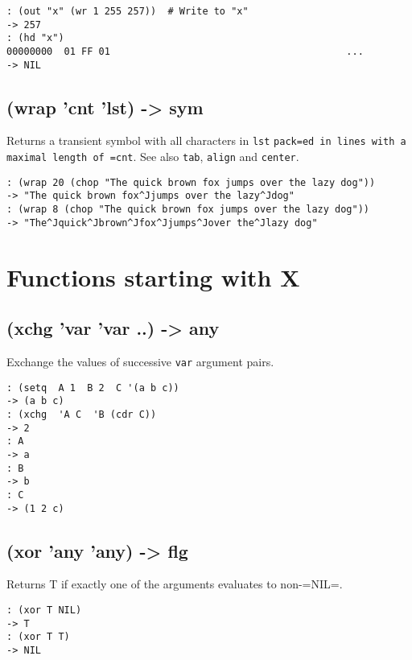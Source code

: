 {{{{{{{{\begin{verbatim}
: (out "x" (wr 1 255 257))  # Write to "x"
-> 257
: (hd "x")
00000000  01 FF 01                                         ...
-> NIL
\end{verbatim}

 
\section{(wrap 'cnt 'lst) -> sym}
\label{sec-8-1-23-10}


Returns a transient symbol with all characters in \texttt{lst} \texttt{pack=ed in lines with a maximal length of =cnt}. See also \texttt{tab}, \texttt{align} and
\texttt{center}.


\begin{verbatim}
: (wrap 20 (chop "The quick brown fox jumps over the lazy dog"))
-> "The quick brown fox^Jjumps over the lazy^Jdog"
: (wrap 8 (chop "The quick brown fox jumps over the lazy dog"))
-> "The^Jquick^Jbrown^Jfox^Jjumps^Jover the^Jlazy dog"
\end{verbatim}



\chapter{Functions starting with X}
\label{sec-8-1-24}


 
\section{(xchg 'var 'var ..) -> any}
\label{sec-8-1-24-1}


Exchange the values of successive \texttt{var} argument pairs.


\begin{verbatim}
: (setq  A 1  B 2  C '(a b c))
-> (a b c)
: (xchg  'A C  'B (cdr C))
-> 2
: A
-> a
: B
-> b
: C
-> (1 2 c)
\end{verbatim}

 
\section{(xor 'any 'any) -> flg}
\label{sec-8-1-24-2}


Returns T if exactly one of the arguments evaluates to non-=NIL=.


\begin{verbatim}
: (xor T NIL)
-> T
: (xor T T)
-> NIL
\end{verbatim}

}}}}}}}}

